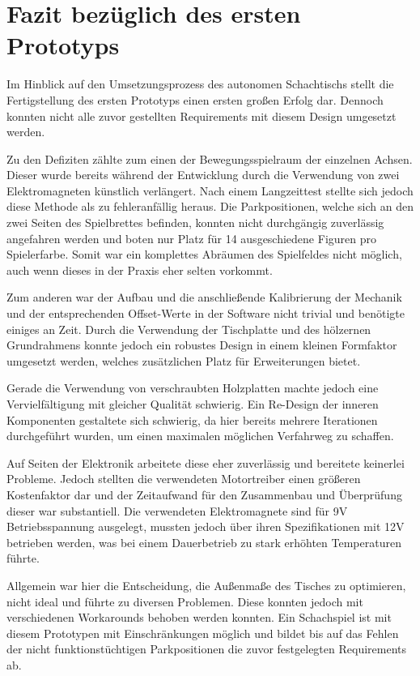 \hypertarget{fazit-bezuxfcglich-des-ersten-prototyps}{%
\section{Fazit bezüglich des ersten
Prototyps}\label{fazit-bezuxfcglich-des-ersten-prototyps}}

Im Hinblick auf den Umsetzungsprozess des autonomen Schachtischs stellt
die Fertigstellung des ersten Prototyps einen ersten großen Erfolg dar.
Dennoch konnten nicht alle zuvor gestellten Requirements mit diesem
Design umgesetzt werden.

Zu den Defiziten zählte zum einen der Bewegungsspielraum der einzelnen
Achsen. Dieser wurde bereits während der Entwicklung durch die
Verwendung von zwei Elektromagneten künstlich verlängert. Nach einem
Langzeittest stellte sich jedoch diese Methode als zu fehleranfällig
heraus. Die Parkpositionen, welche sich an den zwei Seiten des
Spielbrettes befinden, konnten nicht durchgängig zuverlässig angefahren
werden und boten nur Platz für 14 ausgeschiedene Figuren pro
Spielerfarbe. Somit war ein komplettes Abräumen des Spielfeldes nicht
möglich, auch wenn dieses in der Praxis eher selten vorkommt.

Zum anderen war der Aufbau und die anschließende Kalibrierung der
Mechanik und der entsprechenden Offset-Werte in der Software nicht
trivial und benötigte einiges an Zeit. Durch die Verwendung der
Tischplatte und des hölzernen Grundrahmens konnte jedoch ein robustes
Design in einem kleinen Formfaktor umgesetzt werden, welches
zusätzlichen Platz für Erweiterungen bietet.

Gerade die Verwendung von verschraubten Holzplatten machte jedoch eine
Vervielfältigung mit gleicher Qualität schwierig. Ein Re-Design der
inneren Komponenten gestaltete sich schwierig, da hier bereits mehrere
Iterationen durchgeführt wurden, um einen maximalen möglichen Verfahrweg
zu schaffen.

Auf Seiten der Elektronik arbeitete diese eher zuverlässig und bereitete
keinerlei Probleme. Jedoch stellten die verwendeten Motortreiber einen
größeren Kostenfaktor dar und der Zeitaufwand für den Zusammenbau und
Überprüfung dieser war substantiell. Die verwendeten Elektromagnete sind
für 9V Betriebsspannung ausgelegt, mussten jedoch über ihren
Spezifikationen mit 12V betrieben werden, was bei einem Dauerbetrieb zu
stark erhöhten Temperaturen führte.

Allgemein war hier die Entscheidung, die Außenmaße des Tisches zu
optimieren, nicht ideal und führte zu diversen Problemen. Diese konnten
jedoch mit verschiedenen Workarounds behoben werden konnten. Ein
Schachspiel ist mit diesem Prototypen mit Einschränkungen möglich und
bildet bis auf das Fehlen der nicht funktionstüchtigen Parkpositionen
die zuvor festgelegten Requirements ab.

